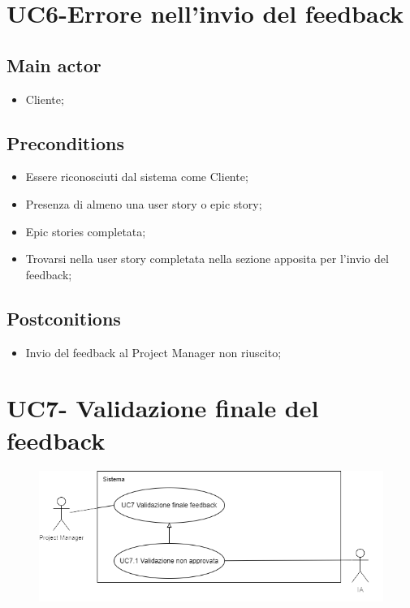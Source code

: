 \documentclass{article}
\begin{document}
\section{UC6-Errore nell'invio del feedback}

     \subsection*{Main actor}
     \begin{itemize}
         \item Cliente;
     \end{itemize}
     \subsection*{Preconditions} 
 \begin{itemize}
        \item Essere riconosciuti dal sistema come Cliente;
        \item Presenza di almeno una user story o epic story;
        \item Epic stories completata;
        \item Trovarsi nella user story completata nella sezione apposita per l'invio del feedback;
    \end{itemize}
     \subsection*{Postconitions} 
        \begin{itemize}
            \item Invio del feedback al Project Manager non riuscito;
        \end{itemize} 

        
\section{UC7- Validazione finale del feedback}

\begin{figure}[h]
      \centering
      \includegraphics{documenti/imgUML/UC7.png}
      \label{fig:immagine}
    \end{figure}
    
\end{document}
